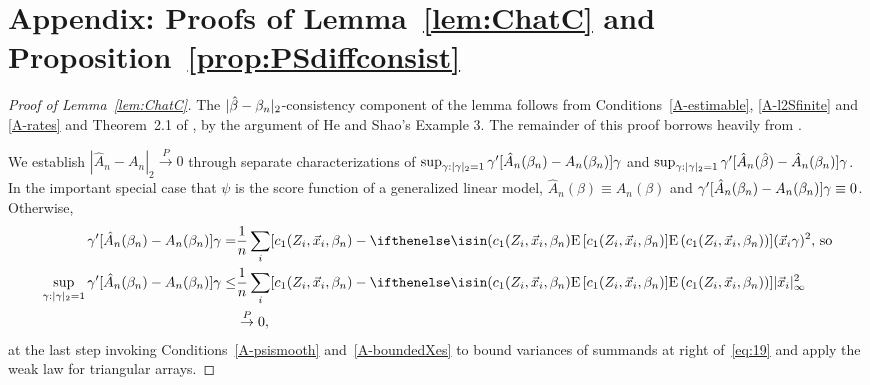 \documentclass{article}
\theoremstyle{remark}
\begin{document}



\appendix

\section*{Appendix: Proofs of Lemma~\ref{lem:ChatC} and Proposition~\ref{prop:PSdiffconsist}}
\begin{proof}[Proof of Lemma~\ref{lem:ChatC}]
The $|\hat\beta - \beta_{n }|_{2}$-consistency component of the lemma follows from Conditions~\ref{A-estimable}, \ref{A-l2Sfinite} and \ref{A-rates} and Theorem~2.1 of \citet{he2000parameters}, by the argument of He and Shao's Example 3.
The remainder of this proof borrows heavily from \citet[][Proof of Thm.~3.10]{wang2011gee}.

We establish $|\hat{A}_{n} - A_{n}|_{2} \stackrel{P}{\rightarrow} 0$ through separate characterizations of  
$\sup_{\gamma: |\gamma|_{2}=1}\gamma'[\hat{A}_{n}(\beta_{n }) - A_{n}(\beta_{n })]\gamma$ and $\sup_{\gamma: |\gamma|_{2}=1}\gamma'[\hat{A}_{n}(\hat\beta) - \hat{A}_{n}(\beta_{n })]\gamma$.  In the important special case that $\psi$ is the score function of a generalized linear model, $\hat{A}_{n}(\beta) \equiv A_{n}(\beta)$ and $\gamma'[\hat{A}_{n}(\beta_{n }) - A_{n}(\beta_{n })]\gamma \equiv 0$.  Otherwise, 
\begin{align}
  \gamma'[\hat{A}_{n}(\betatrue) - A_{n}(\betatrue)]\gamma =& \frac{1}{n} \sum_{i} [c_{1}(Z_{i}, \vec{x}_{i}, \betatrue) - \E{c_{1}(Z_{i}, \vec{x}_{i}, \betatrue)}](\vec{x}_{i}\gamma)^{2},\, \text{so} \nonumber \\
\sup_{\gamma: |\gamma|_{2}=1}\gamma'[\hat{A}_{n}(\betatrue) - A_{n}(\betatrue)]\gamma \leq&
\frac{1}{n} \sum_{i} [c_{1}(Z_{i}, \vec{x}_{i}, \betatrue) - \E{c_{1}(Z_{i}, \vec{x}_{i}, \betatrue)}]|\vec{x}_{i}|_{\infty}^{2} \label{eq:19}\\
& \stackrel{P}{\rightarrow} 0, \nonumber
\end{align}
at the last step invoking Conditions~\ref{A-psismooth} 
and~\ref{A-boundedXes}  %
to bound variances of summands at right of~\eqref{eq:19} and apply the weak law for triangular arrays. 


\end{proof}
\end{document}
